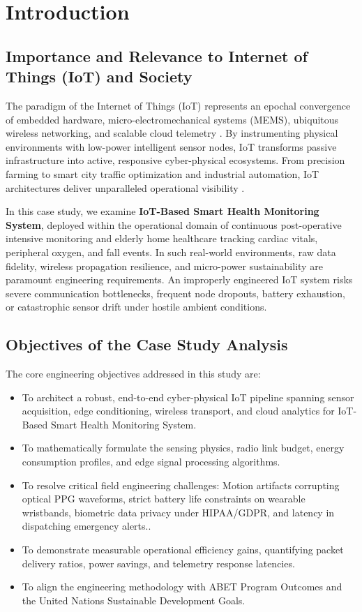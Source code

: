 \section{Introduction}

\subsection{Importance and Relevance to Internet of Things (IoT) and Society}
The paradigm of the Internet of Things (IoT) represents an epochal convergence of embedded hardware, micro-electromechanical systems (MEMS), ubiquitous wireless networking, and scalable cloud telemetry \cite{al2015internet}. By instrumenting physical environments with low-power intelligent sensor nodes, IoT transforms passive infrastructure into active, responsive cyber-physical ecosystems. From precision farming to smart city traffic optimization and industrial automation, IoT architectures deliver unparalleled operational visibility \cite{zanella2014internet}.

In this case study, we examine \textbf{IoT-Based Smart Health Monitoring System}, deployed within the operational domain of continuous post-operative intensive monitoring and elderly home healthcare tracking cardiac vitals, peripheral oxygen, and fall events. In such real-world environments, raw data fidelity, wireless propagation resilience, and micro-power sustainability are paramount engineering requirements. An improperly engineered IoT system risks severe communication bottlenecks, frequent node dropouts, battery exhaustion, or catastrophic sensor drift under hostile ambient conditions.

\subsection{Objectives of the Case Study Analysis}
The core engineering objectives addressed in this study are:
\begin{itemize}
  \item To architect a robust, end-to-end cyber-physical IoT pipeline spanning sensor acquisition, edge conditioning, wireless transport, and cloud analytics for IoT-Based Smart Health Monitoring System.
  \item To mathematically formulate the sensing physics, radio link budget, energy consumption profiles, and edge signal processing algorithms.
  \item To resolve critical field engineering challenges: Motion artifacts corrupting optical PPG waveforms, strict battery life constraints on wearable wristbands, biometric data privacy under HIPAA/GDPR, and latency in dispatching emergency alerts..
  \item To demonstrate measurable operational efficiency gains, quantifying packet delivery ratios, power savings, and telemetry response latencies.
  \item To align the engineering methodology with ABET Program Outcomes and the United Nations Sustainable Development Goals.
\end{itemize}
